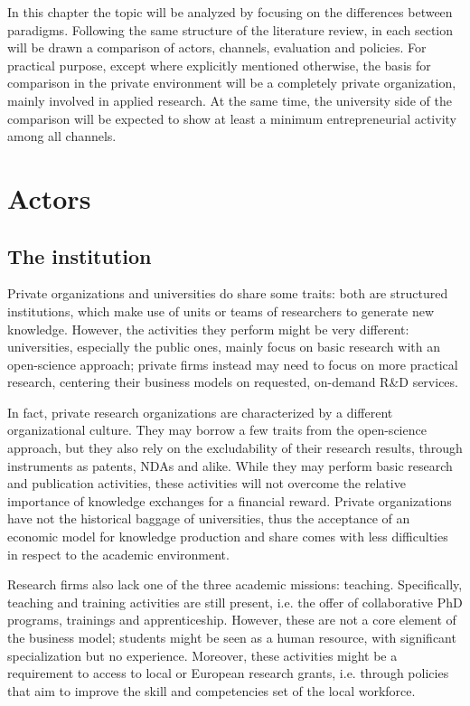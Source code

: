 In this chapter the topic will be analyzed by focusing on the differences between paradigms. Following the same structure of the literature review, in each section will be drawn a comparison of actors, channels, evaluation and policies. For practical purpose, except where explicitly mentioned otherwise, the basis for comparison in the private environment will be a completely private organization, mainly involved in applied research. At the same time, the university side of the comparison will be expected to show at least a minimum entrepreneurial activity among all channels. 

\section{Actors}

\subsection{The institution}

Private organizations and universities do share some traits: both are structured institutions, which make use of units or teams of researchers to generate new knowledge. However, the activities they perform might be very different: universities, especially the public ones, mainly focus on basic research with an open-science approach; private firms instead may need to focus on more practical research, centering their business models on requested, on-demand R\&D services.

In fact, private research organizations are characterized by a different organizational culture. They may borrow a few traits from the open-science approach, but they also rely on the excludability of their research results, through instruments as patents, NDAs and alike. While they may perform basic research and publication activities, these activities will not overcome the relative importance of knowledge exchanges for a financial reward. Private organizations have not the historical baggage of universities, thus the acceptance of an economic model for knowledge production and share comes with less difficulties in respect to the academic environment.

Research firms also lack one of the three academic missions: teaching. Specifically, teaching and training activities are still present, i.e. the offer of collaborative PhD programs, trainings and apprenticeship. However, these are not a core element of the business model; students might be seen as a human resource, with significant specialization but no experience. Moreover, these activities might be a requirement to access to local or European research grants, i.e. through policies that aim to improve the skill and competencies set of the local workforce. 

